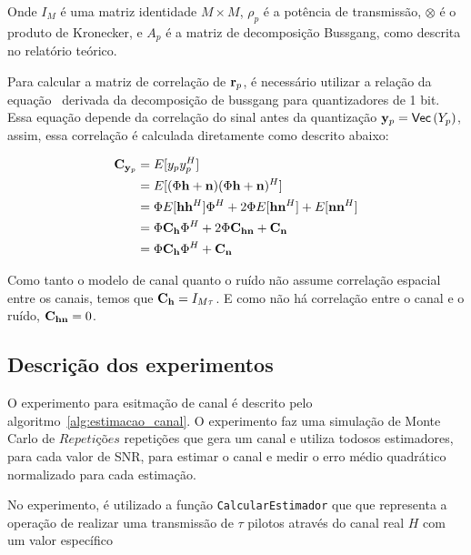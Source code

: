 \documentclass{article}
\begin{document}
Onde $I_M$ é uma matriz identidade $M\times M$, $\rho_p$ é a potência de transmissão, $\otimes$ é o produto de Kronecker, e $A_p$ é a matriz de decomposição Bussgang, como descrita no relatório teórico.

Para calcular a matriz de correlação de $\mathbf{r}_p$, é necessário utilizar a relação da equação~\cite[eq. (13)]{li.etal_2017a} derivada da decomposição de bussgang para quantizadores de 1 bit. Essa equação depende da correlação do sinal antes da quantização $\mathbf{y}_p= \mathsf{Vec} \left( Y_p \right) $, assim, essa correlação é calculada diretamente como descrito abaixo:

\begin{align}
    \label{eq:calculo_correlacao_yp}
    \mathbf{C}_{\mathbf{y}_p}   &= E[y_py_p^H] \\ \nonumber
                    &= E[(\Phi \mathbf{h} + \mathbf{n})(\Phi \mathbf{h} + \mathbf{n})^H] \\ \nonumber 
                    &= \Phi E[\mathbf{h} \mathbf{h}^H] \Phi^H + 2\Phi E[\mathbf{h}\mathbf{n}^H] + E[\mathbf{n}\mathbf{n}^H] \\ \nonumber 
                    &= \Phi \mathbf{C}_{\mathbf{h}} \Phi^H + 2\Phi\mathbf{C}_{\mathbf{h}\mathbf{n}} + \mathbf{C}_{\mathbf{n}} \\ \nonumber 
                    &= \Phi \mathbf{C}_{\mathbf{h}} \Phi^H + \mathbf{C}_{\mathbf{n}}
\end{align}

Como tanto o modelo de canal quanto o ruído não assume correlação espacial entre os canais, temos que $\mathbf{C}_{\mathbf{h}}=I_{M\tau}$. E como não há correlação entre o canal e o ruído, $\mathbf{C}_{\mathbf{h}\mathbf{n}}=0$.

\subsection{Descrição dos experimentos}

O experimento para esitmação de canal é descrito pelo algoritmo~\ref{alg:estimacao_canal}. O experimento faz uma simulação de Monte Carlo de $Repetições$ repetições que gera um canal e utiliza todosos estimadores, para cada valor de SNR, para estimar o canal e medir o erro médio quadrático normalizado para cada estimação.  

No experimento, é utilizado a função \texttt{CalcularEstimador} que que representa a operação de realizar uma transmissão de $\tau$ pilotos através do canal real $H$ com um valor específico
\end{document}
